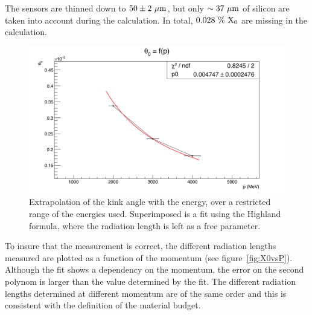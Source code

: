    The sensors are thinned down to $50 \pm 2~\rm{\mu m}$, but only $\sim 37~\rm{\mu m}$ of silicon are taken into account during the calculation.
   In total, $0.028~\%~\rm{X_{0}}$ are missing in the calculation.
   
   \begin{figure}[!h]
     \centering
     \includegraphics[width = \textwidth]{Pictures/X0/theta0VsP_2-4GeV.png}
     \caption{Extrapolation of the kink angle with the energy, over a restricted range of the energies used.
     Superimposed is a fit using the Highland formula, where the radiation length is left as a free parameter.}
     \label{fig:theta0vsP_2-4}
   \end{figure}

   To insure that the measurement is correct, the different radiation lengths measured are plotted as a function of the momentum (see figure~\ref{fig:X0vsP}).
   Although the fit shows a dependency on the momentum, the error on the second polynom is larger than the value determined by the fit.
   The different radiation lengths determined at different momentum are of the same order and this is consistent with the definition of the material budget.




